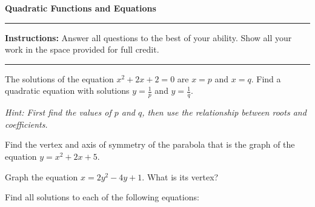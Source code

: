 \documentclass[12pt]{exam}
\newcommand{\examtitle}{Quadratic Functions and Equations}
\newcommand{\instructions}{
    \noindent\rule{\textwidth}{0.5pt}
    \begin{center}
    \textbf{Instructions:} Answer all questions to the best of your ability. Show all your work in the space provided for full credit.
    \end{center}
    \noindent\rule{\textwidth}{0.5pt}
}
\begin{document}
\begin{center}
\textbf{\Large \examtitle} \\
\vspace{0.5cm}
\hspace{0.1\textwidth}
\end{center}

\instructions
\vspace{0.5cm}

\begin{questions}

\pointsinrightmargin

\question[10]
The solutions of the equation $x^2 + 2x + 2 = 0$ are $x = p$ and $x = q$. Find a quadratic equation with solutions $y = \frac{1}{p}$ and $y = \frac{1}{q}$.

\textit{Hint: First find the values of $p$ and $q$, then use the relationship between roots and coefficients.}
\vspace*{4cm}

\question[8]
Find the vertex and axis of symmetry of the parabola that is the graph of the equation $y = x^2 + 2x + 5$.
\vspace*{3cm}

\question[8]
Graph the equation $x = 2y^2 - 4y + 1$. What is its vertex?
\vspace*{4cm}

\newpage

\question[12]
Find all solutions to each of the following equations:


\end{questions}
\end{document}
